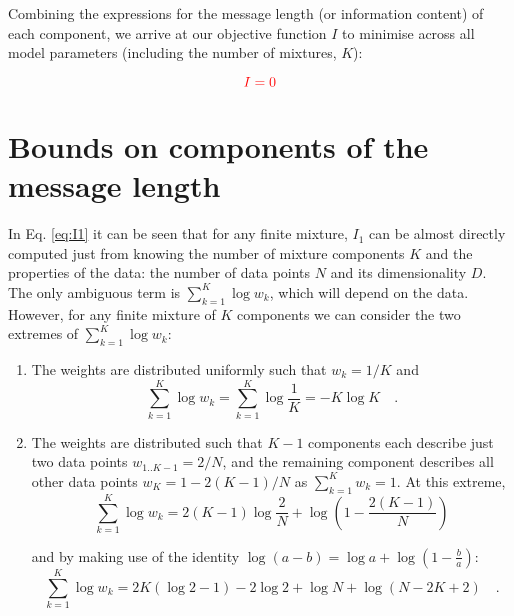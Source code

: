 \documentclass{elsarticle}
\newcommand{\todo}[1]{\textcolor{red}{#1}}
\def\weight{w}
\begin{document}
Combining the expressions for the message length (or information content) of
each component, we arrive at our objective function $I$ to minimise across 
all model parameters (including the number of mixtures, $K$):

\begin{equation}
\todo{I = 0}
\end{equation}


\section{Bounds on components of the message length}


In Eq. \ref{eq:I1} it can be seen that for any finite mixture, $I_1$ can be
almost directly computed just from knowing the number of mixture components
$K$ and the properties of the data: the number of data points $N$ and its
dimensionality $D$. The only ambiguous term is $\sum_{k=1}^{K}\log\weight_k$,
which will depend on the data. However, for any finite mixture of $K$
components we can consider the two extremes of $\sum_{k=1}^{K}\log\weight_k$:

\begin{enumerate}
    \item The weights are distributed uniformly such that $w_k = 1/K$ and
          \begin{equation}
                \sum_{k=1}^{K}\log\weight_k = \sum_{k=1}^{K}\log{\frac{1}{K}} =-K\log{K} \quad .
          \end{equation}
    \item The weights are distributed such that $K - 1$ components each 
          describe just two data points $w_{1..K-1} = 2/N$, and the remaining 
          component describes all other data points $w_{K} = 1 - 2(K-1)/N$
          as $\sum_{k=1}^{K}\weight_k = 1$. At this extreme,
          \begin{equation}
                \sum_{k=1}^{K}\log\weight_k = 2(K-1)\log\frac{2}{N} 
                		    + \log\left(1 - \frac{2(K - 1)}{N}\right)
          \end{equation}

          \noindent{}and by making use of the identity 
            $\log{(a-b)} = \log{a} + \log{(1 - \frac{b}{a})}$:
          \begin{equation}
                \sum_{k=1}^{K}\log\weight_k = 2K\left(\log{2} - 1\right) - 2\log{2} + \log{N} + \log{\left(N - 2K + 2\right)} \quad .
          \end{equation}
\end{enumerate}
\end{document}

